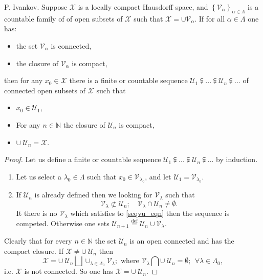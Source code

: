 \documentclass{beamer}
\theoremstyle{plain}
\newcommand{\be}{\begin{equation}}
\newcommand{\ee}{\end{equation}}
\newcommand{\sU}{\mathcal{U}}       %
\newcommand{\sV}{\mathcal{V}}       %
\newcommand{\sX}{\mathcal{X}}       %
\newcommand{\N}{\mathbb{N}}                  %
\renewcommand{\a}{\alpha}
\newcommand{\la}{\lambda}
\newcommand{\La}{\Lambda}
\newcommand{\bydef}{\stackrel{\mathrm{def}}{=}}
\begin{document}
\begin{frame}
\begin{lemma}
	\alert{P. Ivankov}. 	Suppose $\sX$ is a locally compact  Hausdorff space, and $\left\{\sV_\a \right\}_{\a \in  \La}$ is a  countable family of  of open subsets of $\sX$ such that  $\sX = \cup \sV_\a$. If for all $\a \in  \La$ one has:
	\begin{itemize}
	\item the set $\sV_\a$ is connected,
	\item the closure of $\sV_\a$ is compact,
\end{itemize}
then for any $x_0 \in \mathcal X$ there is a finite or countable sequence $\sU_1 \subsetneqq  ...\subsetneqq \sU_n\subsetneqq ...$ of connected open subsets of $\sX$ such that
\begin{itemize}
	\item $x_0 \in \sU_1$,
	\item  For any $n \in \N$ the closure of $\sU_n$ is compact,
	\item $\cup~ \sU_n = \sX$.
\end{itemize} 
\end{lemma}
\end{frame}
\begin{frame}
\begin{proof}
	Let us define a finite or countable sequence $\sU_1 \subsetneqq  ...\subsetneqq \sU_n\subsetneqq ...$ by induction.
	\begin{enumerate}
		\item Let us select a $\la_0 \in  \La$ such that $x_0 \in \sV_{\la_0}$, and let $\sU_1 = \sV_{\la_0}$.
		\item If $\sU_n$ is already defined then we looking for $\sV_\la$ such that
		\be\label{seqvu_eqn}
		\sV_\la \not\subset \sU_n;\quad
		\sV_\la \cap \sU_n \neq \emptyset.
		\ee
		It there is no $\sV_\la$ which satisfies to \eqref{seqvu_eqn} then the sequence is competed. Otherwise one sets $\sU_{n+1}\bydef \sU_n \cup \sV_\la$.
	\end{enumerate} 
	Clearly that for every $n \in \N$ the set $ \sU_n$ is an open connected and has the compact closure. If  $\sX \neq \cup~ \sU_n$ then 
	$$
	\sX  = \cup ~\sU_n \bigsqcup \cup_{\la \in  \La_0} \sV_\la; \text{ where } \sV_\la \bigcap \cup ~\sU_n = \emptyset; ~~ \forall \la \in  \La_0,
	$$ 
	i.e. $\sX$ is not connected. So one has $\sX = \cup~ \sU_n$.
\end{proof}

\end{frame}
\end{document}
